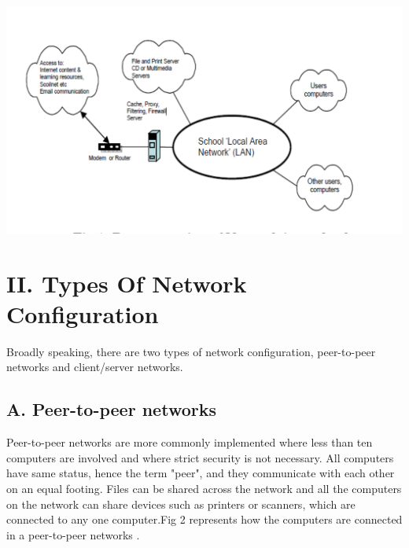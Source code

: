 \documentclass[12pt]{article}
\newenvironment{Figure}
  {\par\medskip\noindent\minipage{\linewidth}}
  {\endminipage\par\medskip}
\begin{document}
\begin{multicols*}{2}
\begin{Figure}
 \centering
 \includegraphics[width=\linewidth]{networkrepresent.png}
\end{Figure}

\section*{II. Types Of Network Configuration}
\indent \indent Broadly speaking, there are two types of
network configuration, peer-to-peer networks and
client/server networks.

\subsection*{A. Peer-to-peer networks}
\indent \indent Peer-to-peer networks are more commonly
implemented where less than ten computers are
involved and where strict security is not necessary. All
computers have same status, hence the term "peer", and
they communicate with each other on an equal footing.
Files can be shared across the network and all the
computers on the network can share devices such as
printers or scanners, which are connected to any one
computer.Fig 2 represents how the computers are
connected in a peer-to-peer networks \cite{4}.


\end{multicols*}
\end{document}
